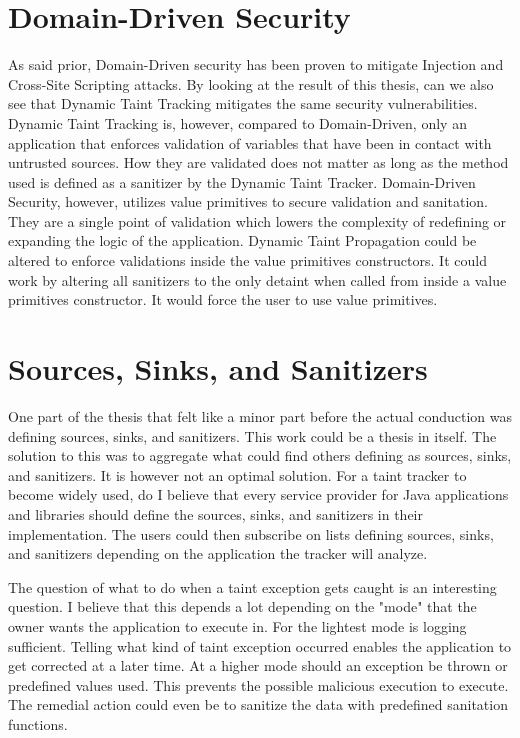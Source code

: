 \section{Domain-Driven Security}
\label{security}
As said prior, Domain-Driven security has been proven to mitigate Injection and Cross-Site Scripting attacks. By looking at the result of this thesis, can we also see that Dynamic Taint Tracking mitigates the same security vulnerabilities. Dynamic Taint Tracking is, however, compared to Domain-Driven, only an application that enforces validation of variables that have been in contact with untrusted sources. How they are validated does not matter as long as the method used is defined as a sanitizer by the Dynamic Taint Tracker. Domain-Driven Security, however, utilizes value primitives to secure validation and sanitation. They are a single point of validation which lowers the complexity of redefining or expanding the logic of the application. Dynamic Taint Propagation could be altered to enforce validations inside the value primitives constructors. It could work by altering all sanitizers to the only detaint when called from inside a value primitives constructor. It would force the user to use value primitives.



\section{Sources, Sinks, and Sanitizers}
\label{sss}
One part of the thesis that felt like a minor part before the actual conduction was defining sources, sinks, and sanitizers. This work could be a thesis in itself. The solution to this was to aggregate what could find others defining as sources, sinks, and sanitizers. It is however not an optimal solution. For a taint tracker to become widely used, do I believe that every service provider for Java applications and libraries should define the sources, sinks, and sanitizers in their implementation. The users could then subscribe on lists defining sources, sinks, and sanitizers depending on the application the tracker will analyze.

The question of what to do when a taint exception gets caught is an interesting question. I believe that this depends a lot depending on the "mode" that the owner wants the application to execute in. For the lightest mode is logging sufficient. Telling what kind of taint exception occurred enables the application to get corrected at a later time. At a higher mode should an exception be thrown or predefined values used. This prevents the possible malicious execution to execute. The remedial action could even be to sanitize the data with predefined sanitation functions. 

